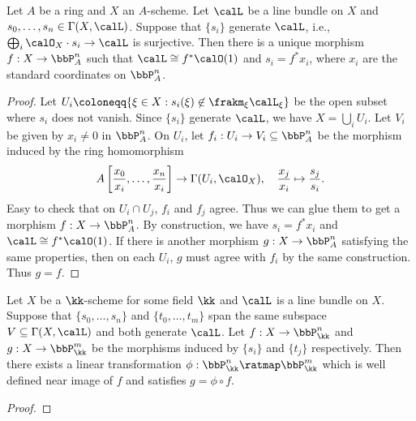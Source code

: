     \begin{theorem}\label{thm:morphism_to_projective_space}
        Let \(A\) be a ring and \(X\) an \(A\)-scheme.
        Let \(\calL\) be a line bundle on \(X\) and \(s_0,\ldots,s_n\in\Gamma(X,\calL)\).
        Suppose that \(\{s_i\}\) generate \(\calL\), i.e., \(\bigoplus_i \calO_X\cdot s_i \to \calL\) is surjective.
        Then there is a unique morphism \(f:X\to \bbP^n_A\) such that \(\calL\cong f^*\calO(1)\) and \(s_i=f^*x_i\), where \(x_i\) are the standard coordinates on \(\bbP^n_A\).   
    \end{theorem}
    \begin{proof}
        Let \(U_i\coloneqq \{\xi \in X: s_i(\xi) \not\in \frakm_\xi \calL_\xi\}\) be the open subset where \(s_i\) does not vanish.
        Since \(\{s_i\}\) generate \(\calL\), we have \(X=\bigcup_i U_i\).
        Let \(V_i\) be given by \(x_i \neq 0\) in \(\bbP^n_A\).
        On \(U_i\), let \(f_i:U_i\to V_i \subseteq \bbP^n_A\) be the morphism induced by the ring homomorphism
        \[ A\left[\frac{x_0}{x_i},\ldots,\frac{x_n}{x_i}\right] \to \Gamma(U_i,\calO_X), \quad \frac{x_j}{x_i} \mapsto \frac{s_j}{s_i}. \]
        Easy to check that on \(U_i\cap U_j\), \(f_i\) and \(f_j\) agree.
        Thus we can glue them to get a morphism \(f:X\to \bbP^n_A\).
        By construction, we have \(s_i=f^*x_i\) and \(\calL\cong f^*\calO(1)\).
        If there is another morphism \(g:X\to \bbP^n_A\) satisfying the same properties, then on each \(U_i\), \(g\) must agree with \(f_i\) by the same construction.
        Thus \(g=f\).
    \end{proof}

    \begin{proposition}\label{prop:different_choices_of_sections_give_different_morphisms_which_differ_by_a_linear_transformation}
        Let \(X\) be a \(\kk\)-scheme for some field \(\kk\) and \(\calL\) is a line bundle on \(X\).
        Suppose that \(\{s_0,\ldots,s_n\}\) and \(\{t_0,\ldots,t_m\}\) span the same subspace \(V\subseteq \Gamma(X,\calL)\) and both generate \(\calL\).
        Let \(f:X\to \bbP^n_\kk\) and \(g:X\to \bbP^m_\kk\) be the morphisms induced by \(\{s_i\}\) and \(\{t_j\}\) respectively.
        Then there exists a linear transformation \(\phi:\bbP^n_\kk \ratmap \bbP^m_\kk\) which is well defined near image of \(f\) and satisfies \(g=\phi \circ f\).
    \end{proposition}
    \begin{proof}
    \end{proof}

